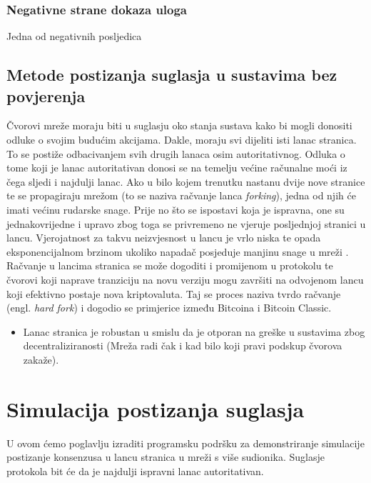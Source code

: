 \documentclass[utf8, zavrsni]{fer}
\begin{document}
\subsection{Negativne strane dokaza uloga}
Jedna od negativnih posljedica 

\section{Metode postizanja suglasja u sustavima bez povjerenja}
Čvorovi mreže moraju biti u suglasju oko stanja sustava kako bi mogli donositi odluke o svojim budućim akcijama. Dakle, moraju svi dijeliti isti lanac stranica. To se postiže odbacivanjem svih drugih lanaca osim autoritativnog. Odluka o tome koji je lanac autoritativan donosi se na temelju većine računalne moći iz čega sljedi i najdulji lanac. Ako u bilo kojem trenutku nastanu dvije nove stranice te se propagiraju mrežom (to se naziva račvanje lanca \textit{forking}), jedna od njih će imati većinu rudarske snage. Prije no što se ispostavi koja je ispravna, one su jednakovrijedne i upravo zbog toga se privremeno ne vjeruje posljednjoj stranici u lancu. Vjerojatnost za takvu neizvjesnost u lancu je vrlo niska te opada eksponencijalnom brzinom ukoliko napadač posjeduje manjinu snage u mreži \cite{nakamoto2012bitcoin}. Račvanje u lancima stranica se može dogoditi i promijenom u protokolu te čvorovi koji naprave tranziciju na novu verziju mogu završiti na odvojenom lancu koji efektivno postaje nova kriptovaluta. Taj se proces naziva tvrdo račvanje (engl. \textit{hard fork}) i dogodio se primjerice između Bitcoina i Bitcoin Classic.
\begin{itemize}
	\item Lanac stranica je robustan u smislu da je otporan na greške u sustavima zbog decentraliziranosti (Mreža radi čak i kad bilo koji pravi podskup čvorova zakaže).
\end{itemize}

\chapter{Simulacija postizanja suglasja}

U ovom ćemo poglavlju izraditi programsku podršku za demonstriranje simulacije postizanje konsenzusa u lancu stranica u mreži s više sudionika. Suglasje protokola bit će da je najdulji ispravni lanac autoritativan.
\end{document}
